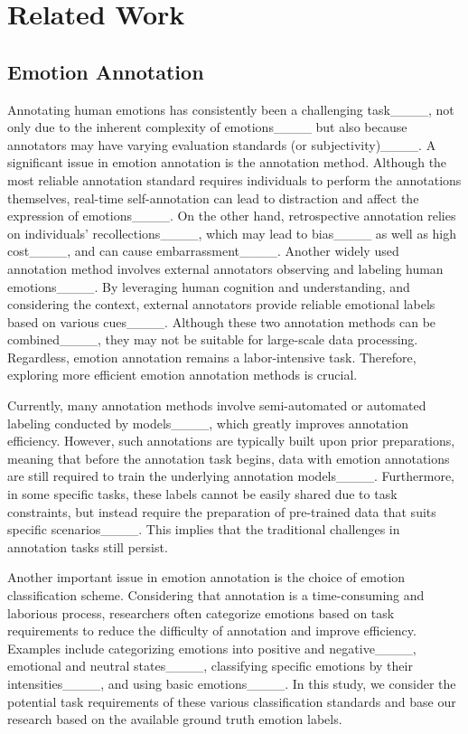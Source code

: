 \section{Related Work}
\subsection{Emotion Annotation}

Annotating human emotions has consistently been a challenging task____, not only due to the inherent complexity of emotions____ but also because annotators may have varying evaluation standards (or subjectivity)____. A significant issue in emotion annotation is the annotation method. Although the most reliable annotation standard requires individuals to perform the annotations themselves, real-time self-annotation can lead to distraction and affect the expression of emotions____. On the other hand, retrospective annotation relies on individuals' recollections____, which may lead to bias____ as well as high cost____, and can cause embarrassment____. Another widely used annotation method involves external annotators observing and labeling human emotions____. By leveraging human cognition and understanding, and considering the context, external annotators provide reliable emotional labels based on various cues____. Although these two annotation methods can be combined____, they may not be suitable for large-scale data processing. Regardless, emotion annotation remains a labor-intensive task. Therefore, exploring more efficient emotion annotation methods is crucial.

Currently, many annotation methods involve semi-automated or automated labeling conducted by models____, which greatly improves annotation efficiency. However, such annotations are typically built upon prior preparations, meaning that before the annotation task begins, data with emotion annotations are still required to train the underlying annotation models____. Furthermore, in some specific tasks, these labels cannot be easily shared due to task constraints, but instead require the preparation of pre-trained data that suits specific scenarios____. This implies that the traditional challenges in annotation tasks still persist.

Another important issue in emotion annotation is the choice of emotion classification scheme. Considering that annotation is a time-consuming and laborious process, researchers often categorize emotions based on task requirements to reduce the difficulty of annotation and improve efficiency. Examples include categorizing emotions into positive and negative____, emotional and neutral states____, classifying specific emotions by their intensities____, and using basic emotions____. In this study, we consider the potential task requirements of these various classification standards and base our research based on the available ground truth emotion labels.


